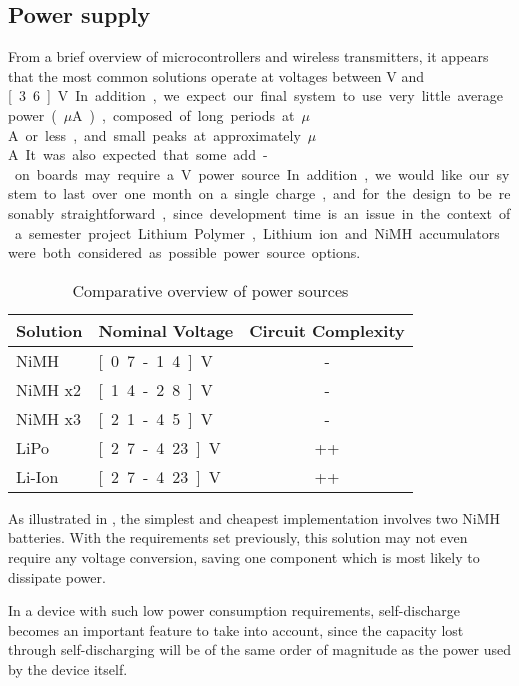 \subsection{Power supply}
\label{sub:power-supply}

From a brief overview of microcontrollers and wireless transmitters, it appears
that the most common solutions operate at voltages between \unit[2]{V} and
\unit[3.6]{V}. In addition, we expect our final system to use very little
average power (\unit[1-10]{$\mu$A}), composed of long periods at
\unit[1]{$\mu$A} or less, and small peaks at approximately \unit[50]{$\mu$A}. It
was also expected that some add-on boards may require a \unit[5]{V} power
source.

In addition, we would like our system to last over one month on a single charge, 
and for the design to be resonably straightforward, since development time is an
issue in the context of a semester project.

Lithium Polymer, Lithium ion and NiMH accumulators were both considered as
possible power source options. 

\begin{table}
  \centering
  \begin{tabular}{l|l|c}
    Solution	& Nominal Voltage	& Circuit Complexity \\
    \hline
    NiMH 	& \unit[0.7-1.4]{V}	& -	     \\
    NiMH x2 	& \unit[1.4-2.8]{V}	& -	     \\
    NiMH x3 	& \unit[2.1-4.5]{V}	& -	     \\
    LiPo 	& \unit[2.7-4.23]{V}	& ++	     \\
    Li-Ion 	& \unit[2.7-4.23]{V}	& ++	     \\
  \end{tabular}
  \caption{Comparative overview of power sources}
  \label{tab:battery-comparison}
\end{table}

As illustrated in , the simplest and cheapest
implementation involves two NiMH batteries. With the requirements set
previously, this solution may not even require any voltage conversion, saving
one component which is most likely to dissipate power.

In a device with such low power consumption requirements, self-discharge becomes
an important feature to take into account, since the capacity lost through
self-discharging will be of the same order of magnitude as the power used by the
device itself.

